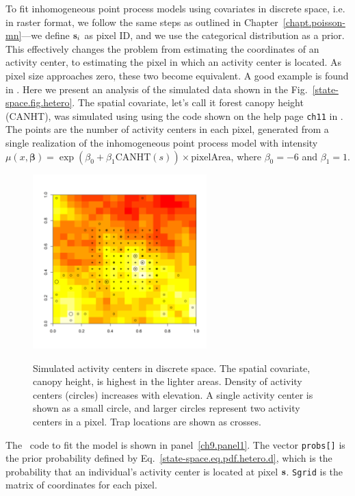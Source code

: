 To fit inhomogeneous point process models using covariates in discrete
space, i.e. in raster format, we follow the same steps
as outlined in Chapter~\ref{chapt.poisson-mn}---we define ${\bf s}_i$ as
pixel ID, and we use the categorical distribution as a prior. This
effectively changes the problem from estimating the coordinates of an
activity center, to estimating the pixel in which an activity center is
located. As pixel size approaches zero, these two become equivalent. A good
example is found in \citep{mollet_etal:2012}. Here we present
an analysis of the simulated data shown in the %
Fig.~\ref{state-space.fig.hetero}. The spatial covariate, let's call it
forest canopy height (CANHT), was simulated
using using the code shown on the help page
\verb+ch11+ in \scrbook. The points are the number of
activity centers in each pixel, generated from a single realization of
the inhomogeneous point process model with intensity
$\mu(x, \bm{\beta}) = \exp(\beta_0 + \beta_1 \text{CANHT}(s))\times\text{pixelArea}$,
where $\beta_0 = -6$ and $\beta_1 = 1$.
\begin{figure}[ht]
\centering
\includegraphics[width=0.6\textwidth]{Ch11/figs/discrete}
\label{ch9.fig.discrete}
\caption{Simulated activity centers in discrete space. The spatial
  covariate, canopy height, is highest in the lighter areas. Density of
  activity centers (circles) increases with elevation. A single
  activity center is shown as a small circle, and larger circles
  represent two activity centers in a pixel. Trap locations
  are shown as crosses.}
\end{figure}

The \bugs~code to fit the model is shown in
panel~\ref{ch9.panel1}. The vector \verb+probs[]+ is the prior
probability defined
by Eq.~\ref{state-space.eq.pdf.hetero.d}, which is the probability that an individual's
activity center is located at pixel $\bf s$. \verb+Sgrid+ is the
matrix of coordinates for each pixel.

